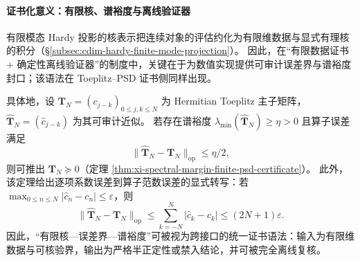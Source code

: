 \paragraph{证书化意义：有限核、谱裕度与离线验证器}
有限模态 Hardy 投影的核表示把连续对象的评估约化为有限维数据与显式有理核的积分（\S\ref{subsec:cdim-hardy-finite-mode-projection}）。
因此，在“有限数据证书 + 确定性离线验证器”的制度中，关键在于为数值实现提供可审计误差界与谱裕度封口；该语法在 Toeplitz--PSD 证书侧同样出现。
\par
具体地，设 \(\mathbf{T}_N=(c_{j-k})_{0\le j,k\le N}\) 为 Hermitian Toeplitz 主子矩阵，\(\widehat{\mathbf{T}}_N=(\widehat c_{j-k})\) 为其可审计近似。
若存在谱裕度 \(\lambda_{\min}(\widehat{\mathbf{T}}_N)\ge \eta>0\) 且算子误差满足
\[
\bigl\|\widehat{\mathbf{T}}_N-\mathbf{T}_N\bigr\|_{\mathrm{op}}\le \eta/2,
\]
则可推出 \(\mathbf{T}_N\succeq 0\)（定理 \ref{thm:xi-spectral-margin-finite-psd-certificate}）。
此外，该定理给出逐项系数误差到算子范数误差的显式转写：若 \(\max_{0\le n\le N}|\widehat c_n-c_n|\le \varepsilon\)，则
\[
\bigl\|\widehat{\mathbf{T}}_N-\mathbf{T}_N\bigr\|_{\mathrm{op}}
\le \sum_{k=-N}^{N}|\widehat c_k-c_k|
\le (2N+1)\varepsilon.
\]
因此，“有限核—误差界—谱裕度”可被视为跨接口的统一证书语法：输入为有限维数据与可核验界，输出为严格半正定性或禁入结论，并可被完全离线复核。

\endinput

